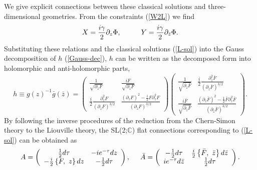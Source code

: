 \documentclass[a4paper,11pt]{article}
\begin{document}
We give explicit connections between these classical solutions and
three-dimensional geometries.
From the constraints (\ref{W2L}) we find 
\begin{equation}
X=\frac{i\gamma}{2}\partial_z \Phi, \hspace{10mm}
Y=\frac{i\gamma}{2}\partial_{\bar{z}} \Phi.
\end{equation}
Substituting these relations and the classical solutions (\ref{L-sol}) 
into the Gauss decomposition of $h$ (\ref{Gauss-dec}), 
$h$ can be written as the decomposed form into holomorphic and 
anti-holomorphic parts,
\begin{equation}
h\equiv g(z)^{-1}\bar{g}(\bar{z})
 = \left(\begin{array}{cc}
    \frac{1}{\sqrt{\partial_zF}} & \frac{iF}{\sqrt{\partial_z F}} \\
    \frac{i}{2}\frac{\partial_z^2 F}
                   {\left(\partial_z F\right)^{3/2}} &
     \frac{\left(\partial_z F\right)^2-\frac{1}{2}F\partial_z^2 F}
          {\left(\partial_z F\right)^{3/2}}
	\end{array}\right)
  \left(\begin{array}{cc}
   \frac{1}{\sqrt{\partial_{\bar{z}} \bar{F}}} & 
             \frac{i}{2}\frac{\partial_{\bar{z}}^2 \bar{F}}
               {\left(\partial_{\bar{z}} \bar{F}\right)^{3/2}} \\
   \frac{i\bar{F}}{\sqrt{\partial_{\bar{z}} \bar{F}}} &
     \frac{\left(\partial_{\bar{z}} \bar{F}\right)^2
            -\frac{1}{2}\bar{F}\partial_{\bar{z}}^2 \bar{F}}
          {\left(\partial_{\bar{z}} \bar{F}\right)^{3/2}}
	\end{array}\right).
\end{equation}
By following the inverse procedures of the reduction from the Chern-Simon 
theory to the Liouville theory, the SL(2;$\mathbb{C}$) 
flat connections corresponding to (\ref{L-sol}) can be obtained as 
\begin{equation}
A=\left(\begin{array}{cc}
   \frac{1}{2}d\tau & -ie^{-\tau}dz \\
   -\frac{i}{2}\left\{F, \ z\right\}dz & -\frac{1}{2}d\tau
	\end{array}\right), 
  \hspace{5mm}
\bar{A}=\left(\begin{array}{cc}
	 -\frac{1}{2}d\tau & 
            \frac{i}{2}\left\{\bar{F}, \ \bar{z}\right\}d\bar{z} \\
         ie^{-\tau}d\bar{z} & \frac{1}{2}d\tau
	      \end{array}\right).
\end{equation}
\end{document}
